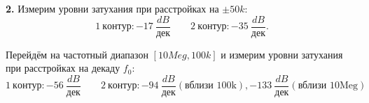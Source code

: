 \textbf{2.} Измерим уровни затухания при расстройках на $\pm 50k$:
\[
1 \ контур: -17 \ \frac{dB}{\text{дек}} \quad \quad 2 \ контур: -35 \ \frac{dB}{\text{дек}}.
\]


Перейдём на частотный диапазон $[10Meg,100k]$ и измерим уровни затухания при расстройках на декаду $f_0$:
\[
1 \ контур: -56 \ \frac{dB}{\text{дек}} \quad \quad  2 \ контур: -94 \ \frac{dB}{\text{дек}}(\text{вблизи 100k}), -133 \ \frac{dB}{\text{дек}}(\text{вблизи 10Meg})
\]
